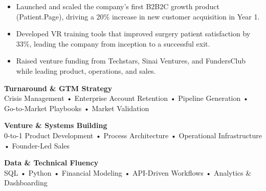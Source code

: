 \documentclass[10pt,a4paper,withhyper]{altacv}
\begin{document}
\begin{itemize}
\item Launched and scaled the company's first B2B2C growth product (Patient.Page), driving a 20\% increase in new customer acquisition in Year 1.
\end{itemize}

\begin{itemize}
\item Developed VR training tools that improved surgery patient satisfaction by 33\%, leading the company from inception to a successful exit.
\item Raised venture funding from Techstars, Sinai Ventures, and FundersClub while leading product, operations, and sales.
\end{itemize}




\textbf{Turnaround \& GTM Strategy}\\
Crisis Management • Enterprise Account Retention • Pipeline Generation • Go-to-Market Playbooks • Market Validation

\textbf{Venture \& Systems Building}\\
0-to-1 Product Development • Process Architecture • Operational Infrastructure • Founder-Led Sales

\textbf{Data \& Technical Fluency}\\
SQL • Python • Financial Modeling • API-Driven Workflows • Analytics \& Dashboarding
\end{document}
